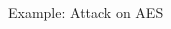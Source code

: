 \documentclass[xcolor=pdftex,dvipsnames,table,final]{beamer}
\begin{document}
\begin{frame}[fragile]{}
\begin{columns}[t]
\begin{column}{.31\linewidth}
\begin{block}{Example: Attack on AES}
       \end{block}
%          
%          
   \end{column}
\end{columns}

\end{frame}
\end{document}
